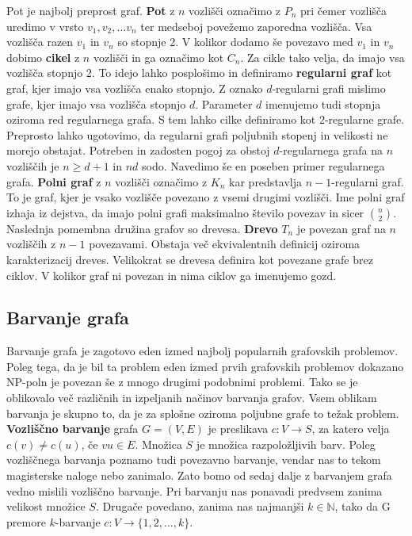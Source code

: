 \documentclass[12pt,a4paper,twoside]{article}
\theoremstyle{definition} %
\theoremstyle{plain} %
\numberwithin{equation}{section}  %
\begin{document}
Pot je najbolj preprost graf. \textbf{Pot} z $n$ vozlišči označimo z $P_n$ pri čemer vozlišča uredimo v vrsto $v_1, v_2, \ldots v_n$ ter medseboj povežemo zaporedna vozlišča. Vsa vozlišča razen $v_1$ in $v_n$ so stopnje 2. V kolikor dodamo še povezavo med $v_1$ in $v_n$ dobimo \textbf{cikel} z $n$ vozlišči in ga označimo kot $C_n$. Za cikle tako velja, da imajo vsa vozlišča stopnjo 2. To idejo lahko posplošimo in definiramo \textbf{regularni graf} kot graf, kjer imajo vsa vozlišča enako stopnjo. Z oznako $d$-regularni grafi mislimo grafe, kjer imajo vsa vozlišča stopnjo $d$. Parameter $d$ imenujemo tudi stopnja oziroma red regularnega grafa. S tem lahko cilke definiramo kot $2$-regularne grafe. Preprosto lahko ugotovimo, da regularni grafi poljubnih stopenj in velikosti ne morejo obstajat. Potreben in zadosten pogoj za obstoj $d$-regularnega grafa na $n$ vozliščih je $n \ge d + 1$ in $nd$ sodo. Navedimo še en poseben primer regularnega grafa. \textbf{Polni graf} z $n$ vozlišči označimo z $K_n$ kar predstavlja $n-1$-regularni graf. To je graf, kjer je vsako vozlišče povezano z vsemi drugimi vozlišči. Ime polni graf izhaja iz dejstva, da imajo polni grafi maksimalno število povezav in sicer ${n \choose 2}$. Naslednja pomembna družina grafov so drevesa. \textbf{Drevo} $T_n$ je povezan graf na $n$ vozliščih z $n-1$ povezavami. Obstaja več ekvivalentnih definicij oziroma karakterizacij dreves. Velikokrat se drevesa definira kot povezane grafe brez ciklov. V kolikor graf ni povezan in nima ciklov ga imenujemo gozd.

\subsection{Barvanje grafa}
Barvanje grafa je zagotovo eden izmed najbolj popularnih grafovskih problemov. Poleg tega, da je bil ta problem eden izmed prvih grafovskih problemov dokazano NP-poln je povezan še z mnogo drugimi podobnimi problemi. Tako se je oblikovalo več različnih in izpeljanih načinov barvanja grafov. Vsem oblikam barvanja je skupno to, da je za splošne oziroma poljubne grafe to težak problem.
\textbf{Vozliščno barvanje} grafa $G=(V, E)$ je preslikava $ c: V \rightarrow S$, za katero velja $c(v) \neq c(u)$, če $vu \in E$. Množica $S$ je množica razpoložljivih barv. Poleg vozliščnega barvanja poznamo tudi povezavno barvanje, vendar nas to tekom magisterske naloge nebo zanimalo. Zato bomo od sedaj dalje z barvanjem grafa vedno mislili vozliščno barvanje. Pri barvanju nas ponavadi predvsem zanima velikost množice $S$. Drugače povedano, zanima nas najmanjši $k \in \mathbb{N}$, tako da G premore $k$-barvanje $c : V \rightarrow \{1,2,\ldots, k\}$. 
\end{document}

